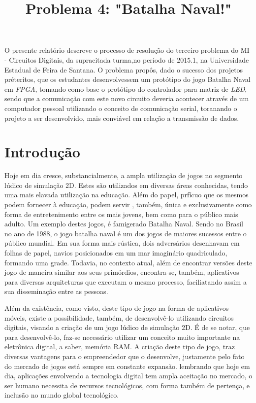 \documentclass[12pt]{article}
\title{Problema 4: "Batalha Naval!"}
\begin{document}
 

\maketitle

\begin{resumo} 
O presente relatório descreve o processo de resolução do terceiro problema do MI - Circuitos Digitais, da supracitada turma,no período de 2015.1, na Universidade Estadual de Feira de Santana. O problema propôs, dado o sucesso dos projetos préteritos, que os estudantes desenvolvessem um protótipo do jogo Batalha Naval em \textit{FPGA}, tomando como base o  protótipo do controlador para matriz de \textit{LED}, sendo que a comunicação com este novo circuito deveria acontecer através de um computador pessoal utilizando o conceito de comunicação serial, toranando o projeto a ser desenvolvido, mais conviável em relação a transmissão de dados.
\end{resumo}

\section{Introdução} \label{sec:firstpage}

Hoje em dia cresce, substancialmente, a ampla utilização de jogos no segmento lúdico de simulação 2D. Estes são utilizados em diversas áreas conhecidas, tendo uma mais elavada utilização na educação. Além do papel, prfícuo que os mesmos podem fornecer à educação, podem servir , também, única e exclusivamente como forma de entretenimento entre os mais jovens, bem como para o público mais adulto. Um exemplo destes jogos, é famigerado Batalha Naval. Sendo no Brasil no ano de 1988, o jogo batalha naval é um dos jogos de maiores sucessos entre o público mundial. Em sua forma mais rústica, dois adversários desenhavam em folhas de papel, navios posicionados em um mar imaginário quadriculado, formando uma grade. Todavia, no contexto atual, além de encontrar versões deste jogo de maneira similar aos seus primórdios, encontra-se, também, aplicativos para diversas arquiteturas que executam o mesmo processo, faciliatando assim a sua disseminação entre as pessoas.

Além da existência, como visto, deste tipo de jogo na forma de aplicativos móveis, existe a possibilidade, também, de desenvolvê-lo utilizando circuitos digitais, visando a criação de um jogo lúdico de simulação 2D.  É de se notar, que para desenvolvê-lo, faz-se necessário utilizar um conceito muito importante na eletrônica digital, a saber, memória RAM. A criação deste tipo de jogo, traz diversas vantagens para o empreendedor que o desenvolve, justamente pelo fato do mercado de jogos está sempre em constante expansão. lembrando que hoje em dia, aplicações envolvendo a tecnologia digital tem ampla aceitação no mercado, o ser humano necessita de recursos tecnológicos, com forma também de pertença, e inclusão no mundo global tecnológico. 
\end{document}
